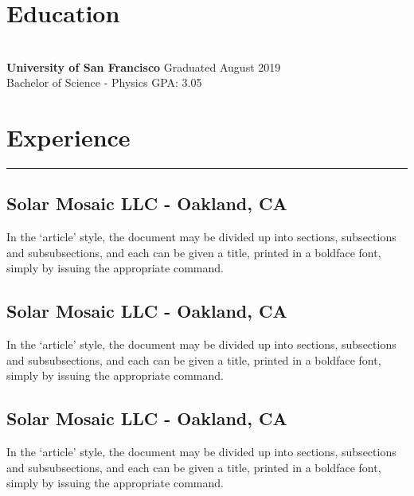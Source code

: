 \documentclass[11pt,a4paper]{article}
\begin{document}
\section*{Education}
\vspace{-6.5mm} %
\noindent\makebox[\linewidth]{\rule{\textwidth}{0.4pt}}
\\
\textbf{University of San Francisco} \hfill Graduated August 2019 \\
Bachelor of Science - Physics \hfill GPA: 3.05

\noindent\makebox[\linewidth]{\rule{\textwidth}{0.4pt}}


\section*{Experience}
\vspace{-3mm} %
\hrule
\vspace{3mm} %

\subsection*{Solar Mosaic LLC - Oakland, CA \hfill {} }

In the `article' style, the document may be divided up
into sections, subsections and subsubsections, and each
can be given a title, printed in a boldface font,
simply by issuing the appropriate command.

\subsection*{Solar Mosaic LLC - Oakland, CA \hfill {} }

In the `article' style, the document may be divided up
into sections, subsections and subsubsections, and each
can be given a title, printed in a boldface font,
simply by issuing the appropriate command.

\subsection*{Solar Mosaic LLC - Oakland, CA \hfill {} }

In the `article' style, the document may be divided up
into sections, subsections and subsubsections, and each
can be given a title, printed in a boldface font,
simply by issuing the appropriate command.
\end{document}
